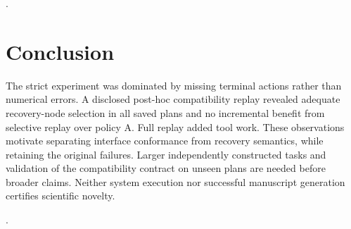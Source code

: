 \documentclass{article}
\begin{document}
\citep{ref0001,ref0002}.

\section{Conclusion}

The strict experiment was dominated by missing terminal actions rather than numerical errors. A disclosed post-hoc compatibility replay revealed adequate recovery-node selection in all saved plans and no incremental benefit from selective replay over policy A. Full replay added tool work. These observations motivate separating interface conformance from recovery semantics, while retaining the original failures. Larger independently constructed tasks and validation of the compatibility contract on unseen plans are needed before broader claims. Neither system execution nor successful manuscript generation certifies scientific novelty.

\citep{ref0001,ref0002}.




\end{document}
